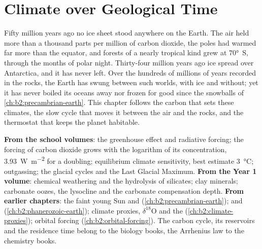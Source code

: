\chapter{Climate over Geological Time}\label{ch:b2:deep-time-climate}

Fifty million years ago no ice sheet stood anywhere on the Earth. The air held more than a
thousand parts per million of carbon dioxide, the poles had warmed far more than the equator, and
forests of a nearly tropical kind grew at \ang{70}~S, through the months of polar night. Thirty-four
million years ago ice spread over Antarctica, and it has never left. Over the hundreds of millions
of years recorded in the rocks, the Earth has swung between such worlds, with ice and without; yet
it has never boiled its oceans away nor frozen for good since the snowballs of
\cref{ch:b2:precambrian-earth}. This chapter follows the carbon that sets these climates, the slow
cycle that moves it between the air and the rocks, and the thermostat that keeps the planet
habitable.

\begin{recall}
\textbf{From the school volumes}: the greenhouse effect and radiative forcing; the forcing of
carbon dioxide grows with the logarithm of its concentration, \qty{3.93}{W.m^{-2}} for a doubling;
equilibrium climate sensitivity, best estimate \qty{3}{\celsius}; outgassing; the glacial cycles
and the Last Glacial Maximum. \textbf{From the Year 1 volume}: chemical weathering and the
hydrolysis of silicates; clay minerals; carbonate oozes, the lysocline and the carbonate
compensation depth. \textbf{From earlier chapters}: the faint young Sun and 
(\cref{ch:b2:precambrian-earth});  and 
(\cref{ch:b2:phanerozoic-earth}); climate proxies, $\delta^{18}$O and the 
(\cref{ch:b2:climate-proxies}); orbital forcing (\cref{ch:b2:orbital-forcing}). The carbon cycle,
its reservoirs and the residence time belong to the biology books, the Arrhenius law to the
chemistry books.
\end{recall}

